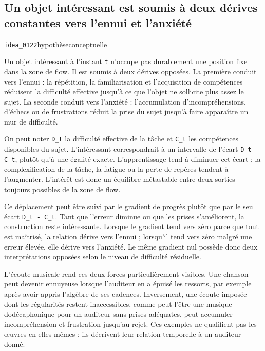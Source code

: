 \documentclass[10pt,a4paper]{article}
\begin{document}
\subsection{Un objet intéressant est soumis à deux dérives constantes vers l'ennui et l'anxiété}
{\small\color{metadata} \texttt{idea\_0122}\quad\textbullet\quad hypothèse\quad\textbullet\quad conceptuelle\par}

Un objet intéressant à l'instant \texttt{t} n'occupe pas durablement une position fixe dans la zone de flow. Il est soumis à deux dérives opposées. La première conduit vers l'ennui : la répétition, la familiarisation et l'acquisition de compétences réduisent la difficulté effective jusqu'à ce que l'objet ne sollicite plus assez le sujet. La seconde conduit vers l'anxiété : l'accumulation d'incompréhensions, d'échecs ou de frustrations réduit la prise du sujet jusqu'à faire apparaître un mur de difficulté.

On peut noter \texttt{D\_t} la difficulté effective de la tâche et \texttt{C\_t} les compétences disponibles du sujet. L'intéressant correspondrait à un intervalle de l'écart \texttt{D\_t - C\_t}, plutôt qu'à une égalité exacte. L'apprentissage tend à diminuer cet écart ; la complexification de la tâche, la fatigue ou la perte de repères tendent à l'augmenter. L'intérêt est donc un équilibre métastable entre deux sorties toujours possibles de la zone de flow.

Ce déplacement peut être suivi par le gradient de progrès plutôt que par le seul écart \texttt{D\_t - C\_t}. Tant que l'erreur diminue ou que les prises s'améliorent, la construction reste intéressante. Lorsque le gradient tend vers zéro parce que tout est maîtrisé, la relation dérive vers l'ennui ; lorsqu'il tend vers zéro malgré une erreur élevée, elle dérive vers l'anxiété. Le même gradient nul possède donc deux interprétations opposées selon le niveau de difficulté résiduelle.

L'écoute musicale rend ces deux forces particulièrement visibles. Une chanson peut devenir ennuyeuse lorsque l'auditeur en a épuisé les ressorts, par exemple après avoir appris l'algèbre de ses cadences. Inversement, une écoute imposée dont les régularités restent inaccessibles, comme peut l'être une musique dodécaphonique pour un auditeur sans prises adéquates, peut accumuler incompréhension et frustration jusqu'au rejet. Ces exemples ne qualifient pas les œuvres en elles-mêmes : ils décrivent leur relation temporelle à un auditeur donné.
\end{document}
